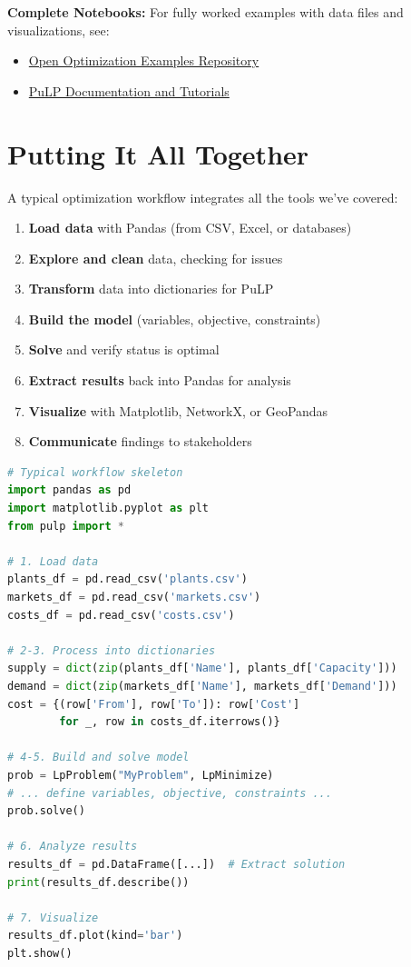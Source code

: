 \begin{info}
\textbf{Complete Notebooks:} For fully worked examples with data files and visualizations, see:
\begin{itemize}
\item \href{https://github.com/open-optimization/open-optimization-or-examples}{Open Optimization Examples Repository}
\item \href{https://coin-or.github.io/pulp/}{PuLP Documentation and Tutorials}
\end{itemize}
\end{info}

\section{Putting It All Together}

A typical optimization workflow integrates all the tools we've covered:

\begin{enumerate}
\item \textbf{Load data} with Pandas (from CSV, Excel, or databases)
\item \textbf{Explore and clean} data, checking for issues
\item \textbf{Transform} data into dictionaries for PuLP
\item \textbf{Build the model} (variables, objective, constraints)
\item \textbf{Solve} and verify status is optimal
\item \textbf{Extract results} back into Pandas for analysis
\item \textbf{Visualize} with Matplotlib, NetworkX, or GeoPandas
\item \textbf{Communicate} findings to stakeholders
\end{enumerate}

\begin{lstlisting}[language=Python]
# Typical workflow skeleton
import pandas as pd
import matplotlib.pyplot as plt
from pulp import *

# 1. Load data
plants_df = pd.read_csv('plants.csv')
markets_df = pd.read_csv('markets.csv')
costs_df = pd.read_csv('costs.csv')

# 2-3. Process into dictionaries
supply = dict(zip(plants_df['Name'], plants_df['Capacity']))
demand = dict(zip(markets_df['Name'], markets_df['Demand']))
cost = {(row['From'], row['To']): row['Cost']
        for _, row in costs_df.iterrows()}

# 4-5. Build and solve model
prob = LpProblem("MyProblem", LpMinimize)
# ... define variables, objective, constraints ...
prob.solve()

# 6. Analyze results
results_df = pd.DataFrame([...])  # Extract solution
print(results_df.describe())

# 7. Visualize
results_df.plot(kind='bar')
plt.show()
\end{lstlisting}

